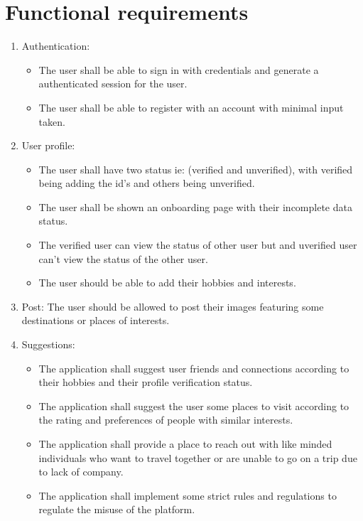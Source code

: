 \documentclass[12pt,a4paper]{report}
\begin{document}
\section{Functional requirements}
\begin{enumerate}
    \item Authentication: 
    \begin{itemize}
        \item The user shall be able to sign in with credentials and generate a authenticated session for the user. 
        \item The user shall be able to register with an account with minimal input taken.
    \end{itemize}

    \item User profile:
    \begin{itemize}
        \item The user shall have two status ie: (verified and unverified), with verified being adding the id's and others being unverified.
        \item The user shall be shown an onboarding page with their incomplete data status.
        \item The verified user can view the status of other user but and uverified user can't view the status of the other user.
        \item The user should be able to add their hobbies and interests.
    \end{itemize}

    \item Post: The user should be allowed to post their images featuring some destinations or places of interests.
    \item Suggestions:
    \begin{itemize}
        \item The application shall suggest user friends and connections according to their hobbies and their profile verification status.
        \item The application shall suggest the user some places to visit according to the rating and preferences of people with similar interests.
        \item The application shall provide a place to reach out with like minded individuals who want to travel together or are unable to go on a trip due to lack of company.
        \item The application shall implement some strict rules and regulations to regulate the misuse of the platform.
    \end{itemize}


\end{enumerate}
\end{document}
